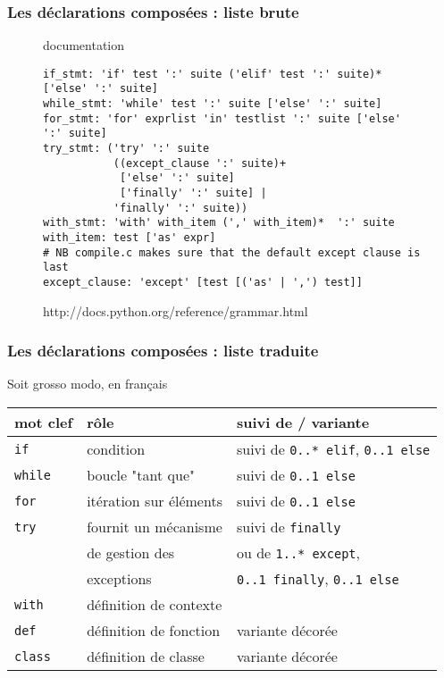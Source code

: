 \begin{frame}[fragile]
  \frametitle{Les déclarations composées : liste brute}
\begin{figure}
  \begin{beamercolorbox}{documentation}
\scriptsize\begin{verbatim}
if_stmt: 'if' test ':' suite ('elif' test ':' suite)* ['else' ':' suite]
while_stmt: 'while' test ':' suite ['else' ':' suite]
for_stmt: 'for' exprlist 'in' testlist ':' suite ['else' ':' suite]
try_stmt: ('try' ':' suite
           ((except_clause ':' suite)+
            ['else' ':' suite]
            ['finally' ':' suite] |
           'finally' ':' suite))
with_stmt: 'with' with_item (',' with_item)*  ':' suite
with_item: test ['as' expr]
# NB compile.c makes sure that the default except clause is last
except_clause: 'except' [test [('as' | ',') test]]
\end{verbatim}
  \end{beamercolorbox}
\def\figurename{extrait de la grammaire de Python}
\caption{http://docs.python.org/reference/grammar.html}
\end{figure}
\end{frame}

\begin{frame}[fragile]
  \frametitle{Les déclarations composées : liste traduite}
Soit grosso modo, en français
\small\begin{tabular}{|l|l|l|}
\hline
mot clef & rôle & suivi de / variante \\
\hline \hline
\texttt{if} & condition & suivi de \texttt{0..* elif}, \texttt{0..1 else}\\ \hline
\texttt{while} & boucle "tant que" & suivi de \texttt{0..1 else}\\ \hline
\texttt{for} & itération sur éléments & suivi de \texttt{0..1 else}\\ \hline
\texttt{try} & fournit un mécanisme & suivi de \texttt{finally} \\
 & de gestion des &  ou de \texttt{1..* except}, \\
 & exceptions & \texttt{0..1 finally}, \texttt{0..1 else}\\ \hline
\texttt{with} & définition de contexte & \\ \hline
\texttt{def} & définition de fonction & variante décorée \\ \hline
\texttt{class} & définition de classe & variante décorée \\ \hline
\end{tabular}
\end{frame}


